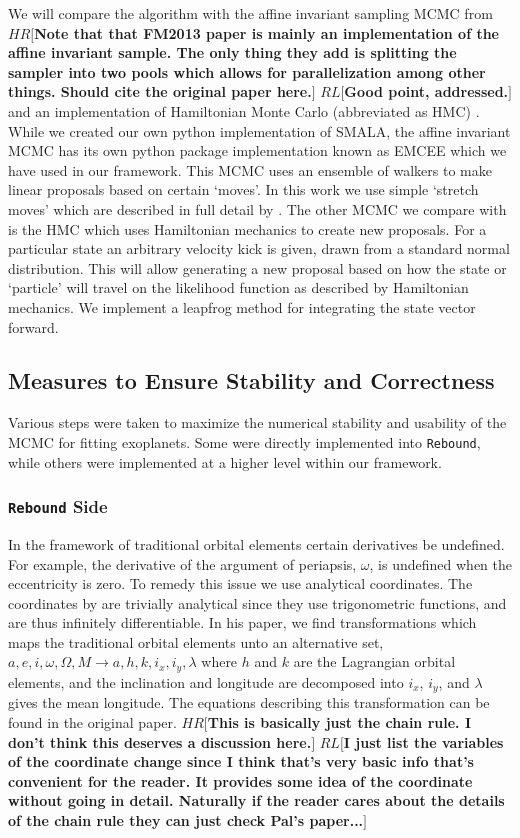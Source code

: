 \documentclass{aa}
\def\memohr#1{\color{blue}$HR[${\bf #1}$]$ \color{black}}
\def\memorl#1{\color{gray}$RL[${\bf #1}$]$ \color{black}}
\begin{document}
We will compare the algorithm with the affine invariant sampling MCMC from \cite{Goodman2010} \memohr{Note that that FM2013 paper is mainly an implementation of the affine invariant sample. The only thing they add is splitting the sampler into two pools which allows for parallelization among other things. Should cite the original paper here.} \memorl{Good point, addressed.} and an implementation of Hamiltonian Monte Carlo (abbreviated as HMC) \citep{Duane1987}.
While we created our own python implementation of SMALA, the affine invariant MCMC has its own python package implementation known as EMCEE which we have used in our framework. 
This MCMC uses an ensemble of walkers to make linear proposals based on certain `moves'. 
In this work we use simple `stretch moves' which are described in full detail by \cite{Foreman-Mackey2013}. 
The other MCMC we compare with is the HMC which uses Hamiltonian mechanics to create new proposals. 
For a particular state an arbitrary velocity kick is given, drawn from a standard normal distribution. 
This will allow generating a new proposal based on how the state or `particle' will travel on the likelihood function as described by Hamiltonian mechanics. We implement a leapfrog method for integrating the state vector forward.

\subsection{Measures to Ensure Stability and Correctness}
Various steps were taken to maximize the numerical stability and usability of the MCMC for fitting exoplanets. Some were directly implemented into \texttt{Rebound}, while others were implemented at a higher level within our framework.

\subsubsection{\texttt{Rebound} Side}\label{analytical}
In the framework of traditional orbital elements certain derivatives be undefined. For example, the derivative of the argument of periapsis, $\omega$, is undefined when the eccentricity is zero. To remedy this issue we use analytical coordinates. The coordinates by \cite{Pl2009} are trivially analytical since they use trigonometric functions, and are thus infinitely differentiable. In his paper, we find transformations which maps the traditional orbital elements unto an alternative set, $a, e, i, \omega, \Omega, M \to a, h, k, i_x, i_y, \lambda$ where $h$ and $k$ are the Lagrangian orbital elements, and the inclination and longitude are decomposed into $i_x$, $i_y$, and $\lambda$ gives the mean longitude. The equations describing this transformation  can be found in the original paper. 
\memohr{This is basically just the chain rule. I don't think this deserves a discussion here.}
\memorl{I just list the variables of the coordinate change since I think that's very basic info that's convenient for the reader. It provides some idea of the coordinate without going in detail. Naturally if the reader cares about the details of the chain rule they can just check Pal's paper...}
\end{document}

